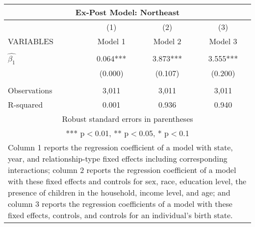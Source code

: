 \begin{tabular}{lccc}
\multicolumn{4}{c}{Ex-Post Model: Northeast} \\ \hline
 & (1) & (2) & (3) \\
VARIABLES & Model 1 & Model 2 & Model 3 \\ \hline
 &  &  &  \\
$\hat{\beta_1}$ & 0.064*** & 3.873*** & 3.555*** \\
 & (0.000) & (0.107) & (0.200) \\
 &  &  &  \\
Observations & 3,011 & 3,011 & 3,011 \\
 R-squared & 0.001 & 0.936 & 0.940 \\ \hline
\multicolumn{4}{c}{ Robust standard errors in parentheses} \\
\multicolumn{4}{c}{ *** p$<$0.01, ** p$<$0.05, * p$<$0.1} \\
\multicolumn{4}{p{0.8\linewidth}}{\small Column 1 reports the regression coefficient of a model with state, year, and relationship-type fixed effects including corresponding interactions; column 2 reports the regression coefficient of a model with these fixed effects and controls for sex, race, education level, the presence of children in the household, income level, and age; and column 3 reports the regression coefficients of a model with these fixed effects, controls, and controls for an individual’s birth state.} \\
\end{tabular}
